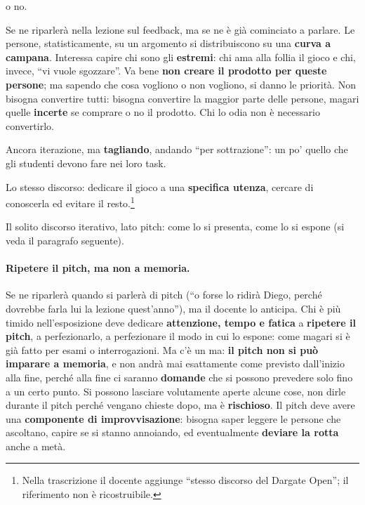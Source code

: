 \begin{description}
{        o no}.
  \item[Polarize people] Se ne riparlerà nella lezione sul feedback, ma se ne
        è già cominciato a parlare. Le persone, statisticamente, su un
        argomento si distribuiscono su una \textbf{curva a campana}.
        Interessa capire chi sono gli \textbf{estremi}: chi ama alla follia
        il gioco e chi, invece, ``vi vuole sgozzare''. Va bene \textbf{non
        creare il prodotto per queste persone}; ma sapendo che cosa vogliono
        o non vogliono, si danno le priorità. Non bisogna convertire tutti:
        bisogna convertire la maggior parte delle persone, magari quelle
        \textbf{incerte} se comprare o no il prodotto. Chi lo odia non è
        necessario convertirlo.
  \item[Churn, baby, churn] Ancora iterazione, ma \textbf{tagliando},
        andando ``per sottrazione'': un po' quello che gli studenti devono
        fare nei loro task.
  \item[Niche thyself] Lo stesso discorso: dedicare il gioco a una
        \textbf{specifica utenza}, cercare di conoscerla ed evitare il
        resto.\footnote{Nella trascrizione il docente aggiunge ``stesso
        discorso del Dargate Open''; il riferimento non è ricostruibile.}
  \item[Perfect your pitch] Il solito discorso iterativo, lato pitch: come lo
        si presenta, come lo si espone (si veda il paragrafo seguente).
\end{description}

\paragraph{Ripetere il pitch, ma non a memoria.} Se ne riparlerà quando si
parlerà di pitch (``o forse lo ridirà Diego, perché dovrebbe farla lui la
lezione quest'anno''), ma il docente lo anticipa. Chi è più timido
nell'esposizione deve dedicare \textbf{attenzione, tempo e fatica} a
\textbf{ripetere il pitch}, a perfezionarlo, a perfezionare il modo in cui lo
espone: come magari si è già fatto per esami o interrogazioni. Ma c'è un ma:
\textbf{il pitch non si può imparare a memoria}, e non andrà mai esattamente
come previsto dall'inizio alla fine, perché alla fine ci saranno
\textbf{domande} che si possono prevedere solo fino a un certo punto. Si
possono lasciare volutamente aperte alcune cose, non dirle durante il pitch
perché vengano chieste dopo, ma è \textbf{rischioso}. Il pitch deve avere una
\textbf{componente di improvvisazione}: bisogna saper leggere le persone che
ascoltano, capire se si stanno annoiando, ed eventualmente \textbf{deviare la
rotta} anche a metà.

